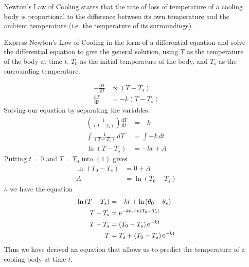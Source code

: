 \documentclass[11pt,a4paper]{book}
\begin{document}
\begin{example}

Newton's Law of Cooling states that the rate of loss of
temperature of a cooling body is proportional to the difference between its own temperature and the ambient temperature (i.e. the temperature of its surroundings).

\medskip

Express Newton's Law of Cooling in the form of a differential equation and solve the differential equation to give the general solution, using
$T$ as the temperature of the body at time $t$, $T_{0}$ as the initial temperature of the body, and $T_{s}$ as the surrounding temperature.

\Solution

\begin{align*}
-\frac{\mathrm{d}T}{\mathrm{d}t} & \propto\left(T-T_{s}\right)\\
\frac{\mathrm{d}T}{\mathrm{d}t} & =-k\left(T-T_{s}\right)
\end{align*}
Solving our equation by separating the variables,
\begin{align*}
\left(\frac{1}{\left(T-T_{s}\right)}\right)\frac{\mathrm{d}T}{\mathrm{d}t} & =-k\\
\int\frac{1}{\left(T-T_{s}\right)}\,dT & =\int-k\,dt\\
\ln\left(T-T_{s}\right) & =-kt+A\tag{1}
\end{align*}
Putting $t=0$ and $T=T_{0}$ into $\left(1\right)$ gives
\begin{align*}
\ln\left(T_{0}-T_{s}\right) & =0+A\\
A & =\ln\left(T_{0}-T_{s}\right)
\end{align*}
$\therefore$ we have the equation
\begin{align*}
\ln\left(T-T_{s}\right) & =-kt+\ln\left(\theta_{0}-\theta_{s}\right)\\
T-T_{s} & ={\rm e}^{-kt+\ln\left(T_{0}-T_{s}\right)}\\
T-T_{s} & =\left(T_{0}-T_{s}\right){\rm e}^{-kt}\\
T & =T_{s}+\left(T_{0}-T_{s}\right){\rm e}^{-kt}
\end{align*}
Thus we have derived an equation that allows us to predict the temperature of a cooling body at time $t$.

\end{example}

\newpage
\end{document}
